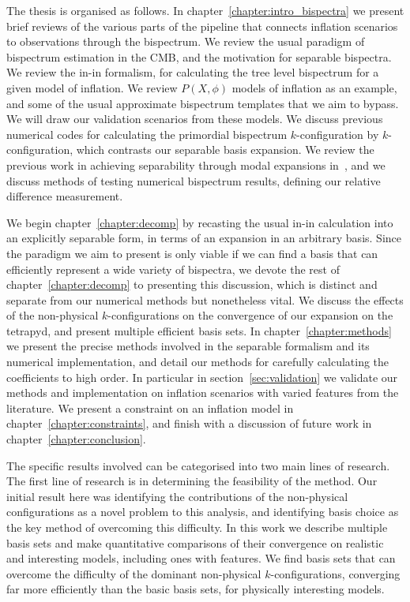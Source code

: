The thesis is organised as follows. In chapter~\ref{chapter:intro_bispectra} we present brief reviews
of the various parts of the pipeline that connects inflation scenarios to observations
through the bispectrum.
We review the usual paradigm of bispectrum estimation in the CMB,
and the motivation for separable bispectra. We review the in-in formalism,
for calculating the tree level bispectrum for a given model of inflation.
We review $P(X,\phi)$ models of inflation as an example, and
some of the usual approximate bispectrum templates
that we aim to bypass.
We will draw our validation scenarios from these models.
We discuss previous numerical codes for
calculating the primordial bispectrum $k$-configuration by $k$-configuration,
which contrasts our separable basis expansion.
We review the previous work in achieving separability through modal expansions
in~\cite{Funakoshi},
and we discuss methods of testing
numerical bispectrum results, defining our relative difference measurement.


We begin chapter~\ref{chapter:decomp} by recasting the usual in-in calculation into an explicitly separable form,
in terms of an expansion in an arbitrary basis.
Since the paradigm we aim to present is only viable if we can find a basis
that can efficiently represent a wide variety of bispectra,
we devote the rest of chapter~\ref{chapter:decomp} to presenting this discussion, which is
distinct and separate from our numerical methods but nonetheless vital.
We discuss the effects of the
non-physical $k$-configurations on the convergence of our expansion on
the tetrapyd, and present multiple efficient basis sets.
In chapter~\ref{chapter:methods} we present the precise methods involved in the
separable formalism and its numerical implementation,
and detail our methods for carefully calculating the coefficients to high order.
In particular in section~\ref{sec:validation} we validate our methods and implementation
on inflation scenarios with varied features from the literature.
We present a constraint on an inflation model in chapter~\ref{chapter:constraints},
and finish with a discussion of future work in chapter~\ref{chapter:conclusion}.


The specific results involved can be categorised into two main lines of research.
The first line of research is in determining the feasibility of the method.
Our initial result here was identifying the contributions of the non-physical configurations
as a novel problem to this analysis, and identifying basis choice as the key method of overcoming this difficulty.
In this work we describe multiple basis sets and make quantitative comparisons
of their convergence on realistic and interesting models, including ones with features.
We find basis sets that can overcome the difficulty of the dominant non-physical $k$-configurations,
converging far more efficiently than the basic basis sets, for physically interesting models.


